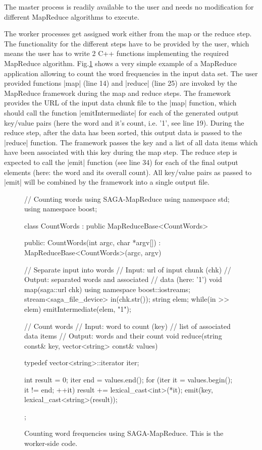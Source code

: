 \documentclass[conference,final]{IEEEtran}
\begin{document}
The master process is readily available to the user and needs no
modification for different MapReduce algorithms to execute.

The worker processes get assigned work either from the map or the
reduce step. The functionality for the different steps have to be
provided by the user, which means the user has to write 2 C++
functions implementing the required MapReduce algorithm.
Fig.\ref{src:saga-mapreduce} shows a very simple example of a
MapReduce application allowing to count the word frequencies in the
input data set. The user provided functions |map| (line 14) and
|reduce| (line 25) are invoked by the MapReduce framework during the
map and reduce steps. The framework provides the URL of the input data
chunk file to the |map| function, which should call the function
|emitIntermediate| for each of the generated output key/value pairs
(here the word and it's count, i.e. '1', see line 19). During the
reduce step, after the data has been sorted, this output data is
passed to the |reduce| function. The framework passes the key and a
list of all data items which have been associated with this key during
the map step. The reduce step is expected to call the |emit| function
(see line 34) for each of the final output elements (here: the word
and its overall count). All key/value pairs as passed to |emit| will
be combined by the framework into a single output file.

\begin{figure}[!ht]
 \begin{center}
  \begin{mycode}[label=SAGA MapReduce Word Count Algorithm]
  // Counting words using SAGA-MapReduce
  using namespace std;
  using namespace boost;

  class CountWords 
    : public MapReduceBase<CountWords> {
  public:
    CountWords(int argc, char *argv[]) 
      : MapReduceBase<CountWords>(argc, argv) 
    {}

    // Separate input into words
    // Input:  url of input chunk (chk)
    // Output: separated words and associated 
    //         data (here: '1')
    void map(saga::url chk) {
      using namespace boost::iostreams;
      stream<saga_file_device> in(chk.str());
      string elem;
      while(in >> elem) 
        emitIntermediate(elem, "1");
    } 

    // Count words
    // Input:  word to count (key)
    //         list of associated data items
    // Output: words and their count
    void reduce(string const& key, 
      vector<string> const& values) {
      typedef vector<string>::iterator iter;

      int result = 0;
      iter end = values.end();
      for (iter it = values.begin(); 
           it != end; ++it) {
        result += lexical_cast<int>(*it);
      }
      emit(key, lexical_cast<string>(result));
    }
  };
  \end{mycode}
  \caption{\label{src:saga-mapreduce} Counting word frequencies using
    SAGA-MapReduce. This is the worker-side code.}
 \end{center}
\end{figure}
\end{document}
